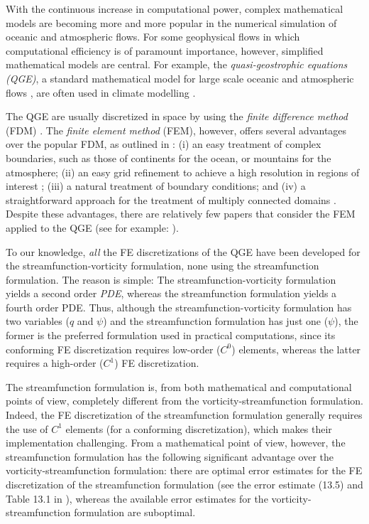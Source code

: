 With the continuous increase in computational power, complex mathematical models
are becoming more and more popular in the numerical simulation of oceanic and
atmospheric flows. For some geophysical flows in which computational efficiency
is of paramount importance, however, simplified mathematical models are central.
For example, the \emph{quasi-geostrophic equations (QGE)}, a standard
mathematical model for large scale oceanic and atmospheric flows
\cite{Cushman11,Majda,Pedlosky92,Vallis06}, are often used in climate modelling
\cite{Dijkstra05}.

The QGE are usually discretized in space by using the \emph{finite difference
method} (FDM) \cite{San11}. The \emph{finite element method} (FEM), however,
offers several advantages over the popular FDM, as outlined in \cite{Myers}: (i)
an easy treatment of complex boundaries, such as those of continents for the
ocean, or mountains for the atmosphere; (ii) an easy grid refinement to achieve
a high resolution in regions of interest \cite{Cascon}; (iii) a natural
treatment of boundary conditions; and (iv) a straightforward approach for the
treatment of multiply connected domains \cite{Myers}. Despite these advantages,
there are relatively few papers that consider the FEM applied to the QGE (see
for example: \cite{Cascon, Fix, LeProvost94, Myers, Stevens82}).

To our knowledge, \emph{all} the FE discretizations of the QGE have been
developed for the streamfunction-vorticity formulation, none using the
streamfunction formulation. The reason is simple: The streamfunction-vorticity
formulation yields a second order \emph{PDE}, whereas the streamfunction
formulation yields a fourth order PDE. Thus, although the
streamfunction-vorticity formulation has two variables ($q$ and $\psi$) and the
streamfunction formulation has just one ($\psi$), the former is the preferred
formulation used in practical computations, since its conforming FE
discretization requires low-order ($C^0$) elements, whereas the latter requires
a high-order ($C^1$) FE discretization.

The streamfunction formulation is, from both mathematical and computational
points of view, completely different from the vorticity-streamfunction
formulation. Indeed, the FE discretization of the streamfunction formulation
generally requires the use of $C^1$ elements (for a conforming discretization),
which makes their implementation challenging. From a mathematical point of view,
however, the streamfunction formulation has the following significant advantage
over the vorticity-streamfunction formulation: there are optimal error estimates
for the FE discretization of the streamfunction formulation (see the error
estimate (13.5) and Table 13.1 in \cite{Gunzburger89}), whereas the available
error estimates for the vorticity-streamfunction formulation are suboptimal.

